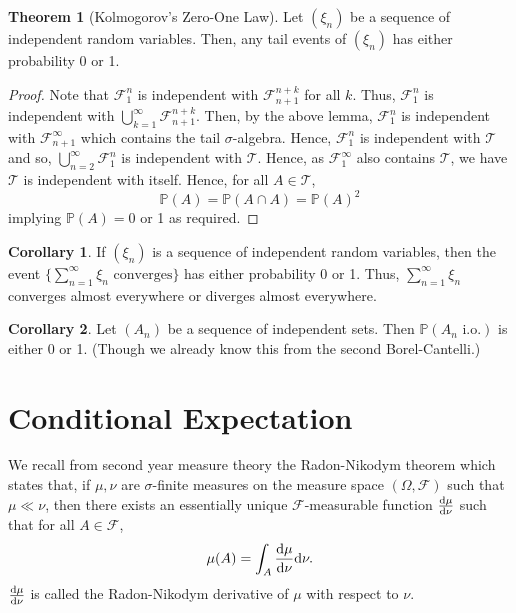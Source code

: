 \documentclass[]{article}
\theoremstyle{definition}
\newtheorem{theorem}{Theorem}
\newtheorem{corollary}{Corollary}[theorem]
\theoremstyle{definition}
\begin{document}
\begin{theorem}[Kolmogorov's Zero-One Law]
  Let \((\xi_n)\) be a sequence of independent random variables. Then, any tail 
  events of \((\xi_n)\) has either probability 0 or 1.
\end{theorem}
\begin{proof}
  Note that \(\mathcal{F}_1^n\) is independent with \(\mathcal{F}_{n + 1}^{n + k}\) 
  for all \(k\). Thus, \(\mathcal{F}_1^n\) is independent with 
  \(\bigcup_{k = 1}^\infty \mathcal{F}_{n+ 1}^{n + k}\). Then, by the above lemma, 
  \(\mathcal{F}_1^n\) is independent with \(\mathcal{F}_{n + 1}^\infty\)
  which contains the tail \(\sigma\)-algebra. Hence, \(\mathcal{F}_1^n\) is
  independent with \(\mathcal{T}\) and so, \(\bigcup_{n = 2}^\infty\mathcal{F}_1^n\) 
  is independent with \(\mathcal{T}\). Hence, as \(\mathcal{F}_1^\infty\) also 
  contains \(\mathcal{T}\), we have \(\mathcal{T}\) is independent with itself.
  Hence, for all \(A \in \mathcal{T}\), 
  \[\mathbb{P}(A) = \mathbb{P}(A \cap A) = \mathbb{P}(A)^2\]
  implying \(\mathbb{P}(A) = 0\) or 1 as required.
\end{proof}

\begin{corollary}
  If \((\xi_n)\) is a sequence of independent random variables, then the event
  \(\{\sum_{n = 1}^\infty \xi_n \text{ converges}\}\) has either probability 0 
  or 1. Thus, \(\sum_{n = 1}^\infty \xi_n\) converges almost everywhere or 
  diverges almost everywhere.
\end{corollary}

\begin{corollary}
  Let \((A_n)\) be a sequence of independent sets. Then 
  \(\mathbb{P}(A_n \text{ i.o.})\) is either 0 or 1. (Though we already 
  know this from the second Borel-Cantelli.)
\end{corollary}

\newpage
\section{Conditional Expectation}

We recall from second year measure theory the Radon-Nikodym theorem which 
states that, if \(\mu, \nu\) are \(\sigma\)-finite measures on the measure space 
\((\Omega, \mathcal{F})\) such that \(\mu \ll \nu\), then there exists an 
essentially unique \(\mathcal{F}\)-measurable function \(\dv{\mu}{\nu}\) 
such that for all \(A \in \mathcal{F}\),
\[\mu(A) = \int_A \dv{\mu}{\nu} \dd \nu.\]
\(\dv{\mu}{\nu}\) is called the Radon-Nikodym derivative of \(\mu\) with respect 
to \(\nu\).
\end{document}
